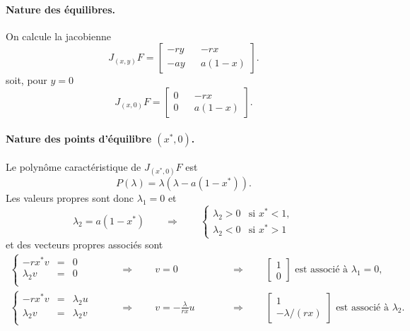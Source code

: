 \paragraph*{Nature des équilibres.}
On calcule la jacobienne
$$
J_{(x, y)}F = 
  \left[\begin{array}{ccc} 
    - r y & & -r x \\
    - a y & & a (1 - x)
  \end{array}\right].
$$
soit, pour $y = 0$
$$
J_{(x, 0)}F = 
  \left[\begin{array}{ccc} 
    0 & & -r x \\
    0 & & a (1 - x)
  \end{array}\right].
$$

\paragraph*{Nature des points d'équilibre $(x^*, 0)$.}
Le polynôme caractéristique de $J_{(x^*, 0)}F$ est
$$
P(\lambda) = \lambda (\lambda - a (1 - x^*)).
$$
Les valeurs propres sont donc $\lambda_1 = 0$ et 
$$
\lambda_2 = a (1 - x^*) 
\qquad \Rightarrow \qquad 
\left\{\begin{array}{ll} 
  \lambda_2 > 0 & \text{si } x^* < 1, \\
  \lambda_2 < 0 & \text{si } x^* > 1
\end{array} \right.
$$
et des vecteurs propres associés sont
\begin{align*}
  \left\{\begin{array}{rcl}
      -r x^* v & = & 0 \\
      \lambda_2 v & = & 0 \\
    \end{array}\right.
    \qquad & \Rightarrow \qquad 
    v = 0 &
    \qquad & \Rightarrow \qquad 
    \left[\begin{array}{c} 1 \\ 0 \end{array}\right] \text{ est associé à } \lambda_1 = 
    0, \\
  \left\{\begin{array}{rcl}
      -r x^* v & = & \lambda_2 u \\
      \lambda_2 v & = & \lambda_2 v \\
    \end{array}\right.
    \qquad & \Rightarrow \qquad 
    v = - \frac{\lambda}{rx} u &
    \qquad & \Rightarrow \qquad 
    \left[\begin{array}{c} 1 \\ -\lambda/(rx) \end{array}\right] \text{ est associé à } \lambda_2.
\end{align*}


